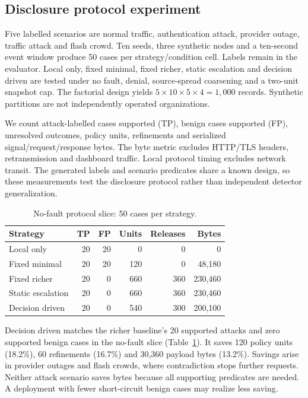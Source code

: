 \documentclass[conference,letterpaper]{IEEEtran}
\begin{document}
\subsection{Disclosure protocol experiment}
Five labelled scenarios are normal traffic, authentication attack, provider outage, traffic attack and flash crowd. Ten seeds, three synthetic nodes and a ten-second event window produce 50 cases per strategy/condition cell. Labels remain in the evaluator. Local only, fixed minimal, fixed richer, static escalation and decision driven are tested under no fault, denial, source-spread coarsening and a two-unit snapshot cap. The factorial design yields $5\times10\times5\times4=1{,}000$ records. Synthetic partitions are not independently operated organizations.

We count attack-labelled cases supported (TP), benign cases supported (FP), unresolved outcomes, policy units, refinements and serialized signal/request/response bytes. The byte metric excludes HTTP/TLS headers, retransmission and dashboard traffic. Local protocol timing excludes network transit. The generated labels and scenario predicates share a known design, so these measurements test the disclosure protocol rather than independent detector generalization.

\begin{table}[t]
\centering\caption{No-fault protocol slice: 50 cases per strategy.}
\label{tab:sharing}\scriptsize
\begin{tabular}{lrrrrr}\hline
Strategy & TP & FP & Units & Releases & Bytes\\\hline
Local only &20&20&0&0&0\\
Fixed minimal &20&20&120&0&48,180\\
Fixed richer &20&0&660&360&230,460\\
Static escalation &20&0&660&360&230,460\\
Decision driven &20&0&540&300&200,100\\\hline
\end{tabular}
\end{table}

Decision driven matches the richer baseline's 20 supported attacks and zero supported benign cases in the no-fault slice (Table~\ref{tab:sharing}). It saves 120 policy units (18.2\%), 60 refinements (16.7\%) and 30,360 payload bytes (13.2\%). Savings arise in provider outages and flash crowds, where contradiction stops further requests. Neither attack scenario saves bytes because all supporting predicates are needed. A deployment with fewer short-circuit benign cases may realize less saving.
\end{document}
